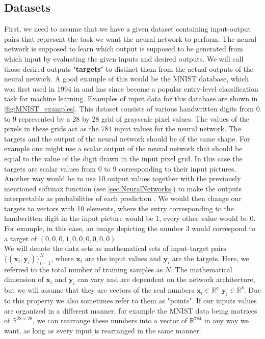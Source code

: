\subsection{Datasets}\label{sec:Datasets}
First, we need to assume that we have a given dataset containing input-output pairs that represent the task we want the neural network to perform. The neural network is supposed to learn which output is supposed to be generated from which input by evaluating the given inputs and desired outputs. We will call those desired outputs "\textbf{targets}" to distinct them from the actual outputs of the neural network. A good example of this would be the MNIST database, which was first used in 1994 in \cite{firstMNISTpaper} and has since become a popular entry-level classification task for machine learning. Examples of input data for this database are shown in \cref{fig:MNIST_examples}. 
This dataset consists of various handwritten digits from 0 to 9 represented by a 28 by 28 grid of grayscale pixel values. The values of the pixels in these grids act as the 784 input values for the neural network. The targets and the output of the neural network should be of the same shape. For example one might use a scalar output of the neural network that should be equal to the value of the digit drawn in the input pixel grid. In this case the targets are scalar values from 0 to 9 corresponding to their input pictures. Another way would be to use 10 output values together with the previously mentioned softmax function (see \cref{sec:NeuralNetworks}) to make the outputs interpretable as probabilities of each prediction \cite{gao2018properties}. We would then change our targets to vectors with 10 elements, where the entry corresponding to the handwritten digit in the input picture would be 1, every other value would be 0. For example, in this case, an image depicting the number 3 would correspond to a target of $(0,0,0,1,0,0,0,0,0,0)$.\\
We will denote the data sets as mathematical sets of input-target pairs $\{(\mathbf{x}_i, \mathbf{y}_i)\}_{i=1}^N$, where $\mathbf{x}_i$ are the input values and $\mathbf{y}_i$ are the targets. Here, we referred to the total number of training samples as $N$. The mathematical dimension of $\mathbf{x}_i$ and $\mathbf{y}_i$ can vary and are dependent on the network architecture, but we will assume that they are vectors of the real numbers $\mathbf{x}_i \in \mathbb{R}^a$ $\mathbf{y}_i \in \mathbb{R}^b$. Due to this property we also sometimes refer to them as "points". If our inputs values are organized in a different manner, for example the MNIST data being matrices of $\mathbb{R}^{28\times28}$, we can rearrange these numbers into a vector of $\mathbb{R}^{784}$ in any way we want, as long as every input is rearranged in the same manner.\\
